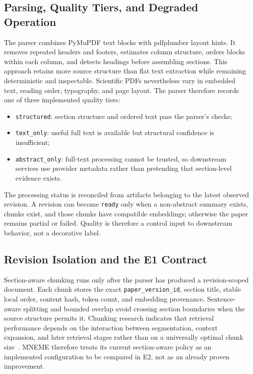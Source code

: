 \subsection{Parsing, Quality Tiers, and Degraded Operation}

The parser combines PyMuPDF text blocks with pdfplumber layout hints. It removes repeated headers and footers, estimates column structure, orders blocks within each column, and detects headings before assembling sections. This approach retains more source structure than flat text extraction while remaining deterministic and inspectable. Scientific PDFs nevertheless vary in embedded text, reading order, typography, and page layout. The parser therefore records one of three implemented quality tiers:
\begin{itemize}
  \item \texttt{structured}: section structure and ordered text pass the parser's checks;
  \item \texttt{text\_only}: useful full text is available but structural confidence is insufficient;
  \item \texttt{abstract\_only}: full-text processing cannot be trusted, so downstream services use provider metadata rather than pretending that section-level evidence exists.
\end{itemize}
The processing status is reconciled from artifacts belonging to the latest observed revision. A revision can become \texttt{ready} only when a non-abstract summary exists, chunks exist, and those chunks have compatible embeddings; otherwise the paper remains partial or failed. Quality is therefore a control input to downstream behavior, not a decorative label.

\subsection{Revision Isolation and the E1 Contract}

Section-aware chunking runs only after the parser has produced a revision-scoped document. Each chunk stores the exact \texttt{paper\_version\_id}, section title, stable local order, content hash, token count, and embedding provenance. Sentence-aware splitting and bounded overlap avoid crossing section boundaries when the source structure permits it. Chunking research indicates that retrieval performance depends on the interaction between segmentation, context expansion, and later retrieval stages rather than on a universally optimal chunk size~\cite{wang2024bestpractices}. MNEME therefore treats its current section-aware policy as an implemented configuration to be compared in E2, not as an already proven improvement.

